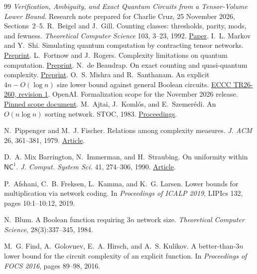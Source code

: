 \documentclass[11pt]{article}
\theoremstyle{definition}
\theoremstyle{remark}
\begin{document}
\begin{thebibliography}{99}
 \emph{Verification, Ambiguity, and Exact
Quantum Circuits from a Tensor-Volume Lower Bound}. Research note
prepared for Charlie Cruz, 25 November 2026, Sections~2--5.
 R.~Beigel and J.~Gill. Counting classes: thresholds,
parity, mods, and fewness. \emph{Theoretical Computer Science} 103,
3--23, 1992. \href{https://cis.temple.edu/~beigel/papers/bg-mods-tcs.html}{Paper}.
 I.~L. Markov and Y.~Shi. Simulating quantum
computation by contracting tensor networks.
\href{https://arxiv.org/abs/quant-ph/0511069}{Preprint}.
 L.~Fortnow and J.~Rogers. Complexity limitations
on quantum computation. \href{https://arxiv.org/abs/cs/9811023}{Preprint}.
 N.~de Beaudrap. On exact counting and quasi-quantum
complexity. \href{https://arxiv.org/abs/1509.07789}{Preprint}.
 O.~S. Mishra and R.~Santhanam.
An explicit $4n-O(\log n)$ size lower bound against general Boolean
circuits. \href{https://eccc.weizmann.ac.il/report/2026/260/}{ECCC
TR26-260, revision 1}.
 OpenAI. Formalization scope for the November 2026 release.
\href{https://github.com/openai/math/blob/3344da59991ed94f9ba711217b29c1d760badfa6/lean/docs/379.md}{Pinned scope document}.
M.~Ajtai, J.~Koml\'os, and E.~Szemer\'edi. An $O(n\log n)$ sorting
network. STOC, 1983. \href{https://doi.org/10.1145/800061.808726}{Proceedings}.

N.~Pippenger and M.~J. Fischer. Relations among complexity measures.
\emph{J. ACM} 26, 361--381, 1979.
\href{https://doi.org/10.1145/322123.322138}{Article}.

D.~A. Mix Barrington, N.~Immerman, and H.~Straubing. On uniformity
within $\mathsf{NC}^1$. \emph{J. Comput. System Sci.} 41, 274--306,
1990. \href{https://doi.org/10.1016/0022-0000(90)90022-D}{Article}.

P.~Afshani, C.~B. Freksen, L.~Kamma, and K.~G. Larsen. Lower bounds for
multiplication via network coding. In \emph{Proceedings of ICALP 2019},
LIPIcs 132, pages 10:1--10:12, 2019.

N.~Blum. A Boolean function requiring $3n$ network size.
\emph{Theoretical Computer Science}, 28(3):337--345, 1984.

M.~G. Find, A.~Golovnev, E.~A. Hirsch, and A.~S. Kulikov. A better-than-$3n$
lower bound for the circuit complexity of an explicit function.
In \emph{Proceedings of FOCS 2016}, pages 89--98, 2016.


\end{thebibliography}
\end{document}
